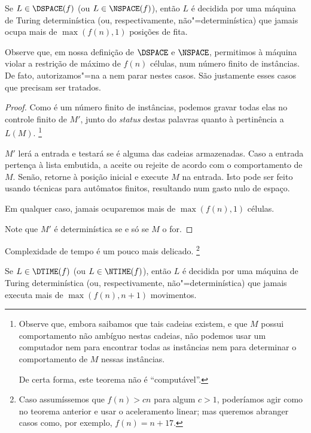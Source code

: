 \begin{theorem}
    Se $L \in \DSPACE(f)$ (ou $L \in \NSPACE(f)$),
    então $L$ é decidida por uma máquina de Turing
    determinística (ou, respectivamente, não"=determinística)
    que jamais ocupa mais de $\max(f(n), 1)$
    posições de fita.
\end{theorem}

Observe que, em nossa definição de $\DSPACE$ e $\NSPACE$,
permitimos à máquina violar a restrição de
máximo de $f(n)$ células,
num número finito de instâncias.
De fato,
autorizamos"=na a nem parar nestes casos.
São justamente esses casos que precisam ser tratados.

\begin{proof}
    Como é um número finito de instâncias,
    podemos gravar todas elas no controle finito de $M'$,
    junto do \emph{status} destas palavras
    quanto à pertinência a $L(M)$.%
    \footnote{
        Observe que,
        embora saibamos que tais cadeias existem,
        e que $M$ possui comportamento não ambíguo
        nestas cadeias,
        não podemos usar um computador
        nem para encontrar todas as instâncias
        nem para determinar o comportamento de $M$ nessas instâncias.

        De certa forma,
        este teorema não é ``computável''.
    }

    $M'$ lerá a entrada
    e testará se é alguma das cadeias armazenadas.
    Caso a entrada pertença à lista embutida,
    a aceite ou rejeite de acordo com o comportamento de $M$.
    Senão, retorne à posição inicial
    e execute $M$ na entrada.
    Isto pode ser feito usando técnicas
    para autômatos finitos,
    resultando num gasto nulo de espaço.

    Em qualquer caso,
    jamais ocuparemos mais de $\max(f(n), 1)$ células.

    Note que $M'$ é determinística
    se e só se $M$ o for.
\end{proof}

Complexidade de tempo é um pouco mais delicado.%
\footnote{
    Caso assumíssemos que $f(n) > cn$
    para algum $c > 1$,
    poderíamos agir como no teorema anterior
    e usar o aceleramento linear;
    mas queremos abranger casos
    como, por exemplo,
    $f(n) = n + 17$.
}

\begin{theorem}
    Se $L \in \DTIME(f)$ (ou $L \in \NTIME(f)$),
    então $L$ é decidida por uma máquina de Turing
    determinística (ou, respectivamente, não"=determinística)
    que jamais executa mais de $\max(f(n), n+1)$ movimentos.
\end{theorem}

